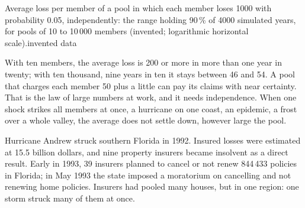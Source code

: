 \begin{omchart}{Average loss per member of a pool in which each member loses 1000 with probability 0.05, independently: the range holding 90\,\% of 4000 simulated years, for
pools of 10 to 10\,000 members (invented; logarithmic horizontal scale).}{invented data}
\end{omchart}

With ten members, the average loss is 200 or more in more than one year in twenty; with ten thousand, nine years in ten it stays between 46 and 54. A pool that charges each member 50
plus a little can pay its claims with near certainty. That is the law of large numbers at work, and it needs independence. When one shock strikes all members at once,
a hurricane on one coast, an epidemic, a frost over a whole valley, the average does not settle down, however large the pool.

\begin{record}
Hurricane Andrew struck southern Florida in 1992. Insured losses were estimated at 15.5 billion dollars, and nine property insurers became insolvent as a direct
result. Early in 1993, 39 insurers planned to cancel or not renew 844\,433 policies in Florida; in May 1993 the state imposed a moratorium on cancelling and not renewing
home policies. Insurers had pooled many houses, but in one region: one storm struck many of them at once.
\end{record}

